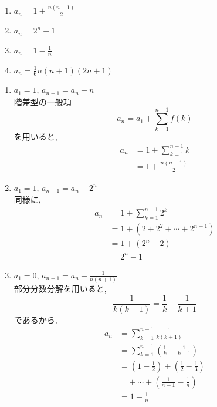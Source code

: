     \noindent{}
    \begin{enumerate}[label=(\arabic*),parsep=3pt,format=\bookitemlink{example-difference-1}{answer}{problem}]
      \item $\displaystyle a_n=1+\frac{n(n-1)}{2}$
      \item $\displaystyle a_n=2^n-1$
      \item $\displaystyle a_n=1-\frac{1}{n}$
      \item $\displaystyle a_n=\frac{1}{6}n(n+1)(2n+1)$
    \end{enumerate}

    \noindent{}
    \begin{enumerate}[label=(\arabic*),parsep=3pt,format=\bookitemlink{example-difference-1}{solution}{problem}]
      \item $\displaystyle a_1=1,\,a_{n+1}=a_n+n$\\
            階差型の一般項
            \[
              a_n=a_1+\sum_{k=1}^{n-1}f(k)
            \]
            を用いると,
            \begin{align*}
              a_n
                &=1+\sum_{k=1}^{n-1}k\\
                &=1+\frac{n(n-1)}{2}
            \end{align*}

      \item $\displaystyle a_1=1,\,a_{n+1}=a_n+2^n$\\
            同様に,
            \begin{align*}
              a_n
                &=1+\sum_{k=1}^{n-1}2^k\\
                &=1+(2+2^2+\cdots+2^{n-1})\\
                &=1+(2^n-2)\\
                &=2^n-1
            \end{align*}

      \item $\displaystyle a_1=0,\,a_{n+1}=a_n+\frac{1}{n(n+1)}$\\
            部分分数分解を用いると,
            \[
              \frac{1}{k(k+1)}
              =\frac{1}{k}-\frac{1}{k+1}
            \]
            であるから,
            \begin{align*}
              a_n
                &=\sum_{k=1}^{n-1}\frac{1}{k(k+1)}\\
                &=\sum_{k=1}^{n-1}
                  \left(\frac{1}{k}-\frac{1}{k+1}\right)\\
                &=\left(1-\frac12\right)
                  +\left(\frac12-\frac13\right)\\
                &\quad +\cdots+\left(\frac{1}{n-1}-\frac1n\right)\\
                &=1-\frac1n
            \end{align*}


\end{enumerate}
